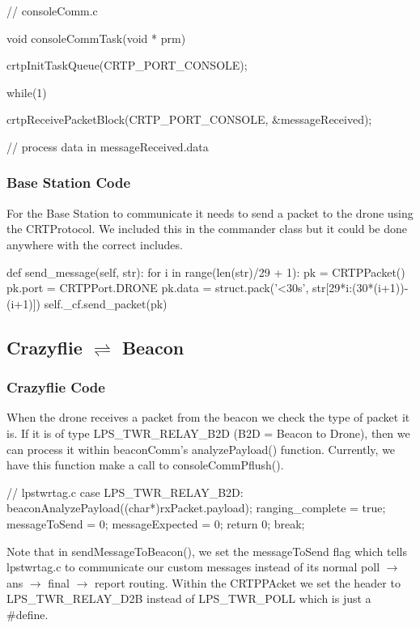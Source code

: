 \documentclass[]{article}
\begin{document}
\newpage
\begin{C}
// consoleComm.c

void consoleCommTask(void * prm) {
	crtpInitTaskQueue(CRTP_PORT_CONSOLE);
	
	while(1) {
		crtpReceivePacketBlock(CRTP_PORT_CONSOLE, &messageReceived);
		
		// process data in messageReceived.data
	}
}
\end{C}

\subsubsection{Base Station Code}

\noindent For the Base Station to communicate it needs to send a packet to the drone using the CRTProtocol. We included this in the commander class but it could be done anywhere with the correct includes.

\begin{Python}
def send_message(self, str):
	for i in range(len(str)/29 + 1):
		pk = CRTPPacket()
		pk.port = CRTPPort.DRONE
		pk.data = struct.pack('<30s', str[29*i:(30*(i+1))-(i+1)])
		self._cf.send_packet(pk)
\end{Python}

\subsection{\texorpdfstring{Crazyflie $\rightleftharpoons$ Beacon}%
	{Between Crazyflie and Beacon}}

\subsubsection{Crazyflie Code}

When the drone receives a packet from the beacon we check the type of packet it is. If it is of type LPS\_TWR\_RELAY\_B2D (B2D = Beacon to Drone), then we can process it within beaconComm's analyzePayload() function. Currently, we have this function make a call to consoleCommPflush().

\begin{C}
// lpstwrtag.c
case LPS_TWR_RELAY_B2D:
{
	beaconAnalyzePayload((char*)rxPacket.payload);
	ranging_complete = true;
	messageToSend = 0;
	messageExpected = 0;
	return 0;
	break;
}
\end{C}

Note that in sendMessageToBeacon(), we set the  messageToSend flag which tells lpstwrtag.c to communicate our custom messages instead of its normal poll $\rightarrow$ ans $\rightarrow$ final $\rightarrow$ report routing. Within the CRTPPAcket we set the header to LPS\_TWR\_RELAY\_D2B instead of LPS\_TWR\_POLL which is just a \#define.
\end{document}
